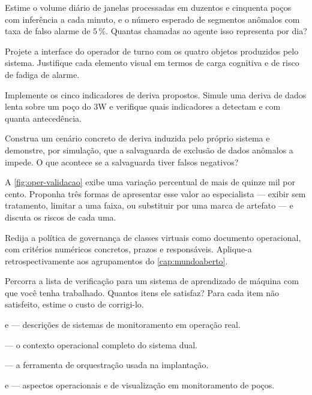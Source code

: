 \begin{exercicios}
\item Estime o volume diário de janelas processadas em duzentos e cinquenta poços com
      inferência a cada minuto, e o número esperado de segmentos anômalos com taxa de
      falso alarme de $5\,\%$. Quantas chamadas ao agente isso representa por dia?

\item Projete a interface do operador de turno com os quatro objetos produzidos pelo
      sistema. Justifique cada elemento visual em termos de carga cognitiva e de risco de
      fadiga de alarme.

\item Implemente os cinco indicadores de deriva propostos. Simule uma deriva de dados
      lenta sobre um poço do 3W e verifique quais indicadores a detectam e com quanta
      antecedência.

\item Construa um cenário concreto de deriva induzida pelo próprio sistema e demonstre,
      por simulação, que a salvaguarda de exclusão de dados anômalos a impede. O que
      acontece se a salvaguarda tiver falsos negativos?

\item A \cref{fig:oper-validacao} exibe uma variação percentual de mais de quinze mil por
      cento. Proponha três formas de apresentar esse valor ao especialista --- exibir sem
      tratamento, limitar a uma faixa, ou substituir por uma marca de artefato --- e
      discuta os riscos de cada uma.

\item Redija a política de governança de classes virtuais como documento operacional,
      com critérios numéricos concretos, prazos e responsáveis. Aplique-a
      retrospectivamente aos agrupamentos do \cref{cap:mundoaberto}.

\item Percorra a lista de verificação para um sistema de aprendizado de máquina com que
      você tenha trabalhado. Quantos itens ele satisfaz? Para cada item não satisfeito,
      estime o custo de corrigi-lo.
\end{exercicios}

\begin{leituras}
\item \citet{aranha2023system} e \citet{Aranha2024} --- descrições de sistemas de
      monitoramento em operação real.
\item \citet{LopesTese2025} --- o contexto operacional completo do sistema dual.
\item \citet{nodered} --- a ferramenta de orquestração usada na implantação.
\item \citet{gatta2022predictive} e \citet{soriano2021visual} --- aspectos operacionais e
      de visualização em monitoramento de poços.
\end{leituras}
